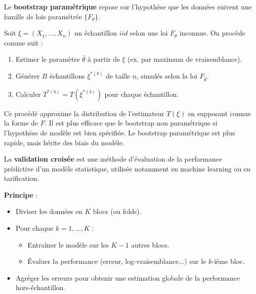 \begin{f}
	
	Le \textbf{bootstrap paramétrique} repose sur l’hypothèse que les données suivent une famille de lois paramétrée $\{F_\theta\}$.
	
	Soit $\xi = (X_1, \ldots, X_n)$ un échantillon $iid$ selon une loi $F_\theta$ inconnue. On procède comme suit :
	\begin{enumerate}
		\item Estimer le paramètre $\hat{\theta}$ à partir de $\xi$ (ex. par maximum de vraisemblance).
		\item Générer $B$ échantillons $\xi^{\ast(b)}$ de taille $n$, simulés selon la loi $F_{\hat{\theta}}$.
		\item Calculer $T^{\ast(b)} = T(\xi^{\ast(b)})$ pour chaque échantillon.
	\end{enumerate}
	
	Ce procédé approxime la distribution de l’estimateur $T(\xi)$ en supposant connue la forme de $F$. Il est plus efficace que le bootstrap non paramétrique si l’hypothèse de modèle est bien spécifiée. Le bootstrap paramétrique est plus rapide, mais hérite des biais du modèle.
	
\end{f}

\begin{f}
	
	La \textbf{validation croisée} est une méthode d’évaluation de la performance prédictive d’un modèle statistique, utilisée notamment en machine learning ou en tarification.
	
	\textbf{Principe} :
	\begin{itemize}
		\item Diviser les données en $K$ blocs (ou folds).
		\item Pour chaque $k = 1,\ldots,K$ :
		\begin{itemize}
			\item Entraîner le modèle sur les $K-1$ autres blocs.
			\item Évaluer la performance (erreur, log-vraisemblance...) sur le $k$-ième bloc.
		\end{itemize}
		\item Agréger les erreurs pour obtenir une estimation globale de la performance hors-échantillon.
	\end{itemize}
	
\end{f}

